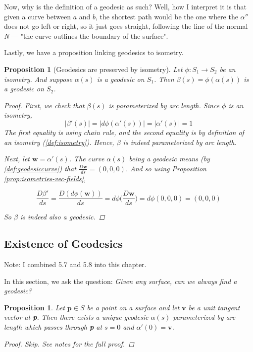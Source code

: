 \documentclass[10pt, a4paper]{article}
\theoremstyle{plain}
\newtheorem{proposition}[theorem]{Proposition}
\theoremstyle{definition}
\theoremstyle{remark}
\newenvironment{sidenote}{%
  \par\vspace{0.5em}%
  \noindent\color{defcolor}%
}{%
  \par\vspace{0.5em}%
  \color{black}%
}
\begin{document}
\begin{sidenote}
    Now, why is the definition of a geodesic as such? Well, how I interpret it is that given a curve between $a$ and $b$, the shortest path would be the one where the $\alpha''$ does not go left or right, so it just goes straight, following the line of the normal \textit{N} --- "the curve outlines the boundary of the surface".
\end{sidenote}

Lastly, we have a proposition linking geodesics to isometry.

\begin{proposition}[Geodesics are preserved by isometry]
Let $\phi :S_1 \to S_2$ be an isometry. And suppose $\alpha(s)$ is a geodesic on $S_1$. Then $\beta(s) =  \phi(\alpha(s))$ is a geodesic on $S_2$.

\begin{proof}
    First, we check that $\beta(s)$ is parameterized by arc length. Since $\phi$ is an isometry, 
    $$|\beta'(s)| = | d\phi(\alpha'(s))| =|\alpha'(s)| =1$$
    The first equality is using chain rule, and the second equality is by definition of an isometry (\ref{def:isometry}). Hence, $\beta$ is indeed parameterized by arc length.

    Next, let $\textbf{w} = \alpha'(s)$. The curve $\alpha(s)$ being a geodesic means (by \ref{def:geodesiccurve}) that $\frac{D\textbf{w}}{ds} = (0,0,0)$. And so using Proposition \ref{prop:isometries-vec-fields},

    $$\frac{D\beta'}{ds} =\frac{D (d\phi(\textbf{w}))}{ds} = d\phi \Bigg(\frac{D\textbf{w}}{ds} \Bigg) = d\phi(0,0,0) = (0,0,0)$$

So $\beta$ is indeed also a geodesic.
\end{proof}
\end{proposition}

\subsection{Existence of Geodesics}
\begin{sidenote}
    Note: I combined 5.7 and 5.8 into this chapter.
\end{sidenote}
In this section, we ask the question: \textit{Given any surface, can we always find a geodesic?}

\begin{proposition}\label{prop:existence-of-geodesic}
    Let $\textbf{p} \in S$ be a point on a surface and let $\textbf{v}$ be a unit tangent vector at \textbf{p}. Then there exists a unique geodesic $\alpha(s)$ parameterized by arc length
 which passes through \textbf{p} at $s=0$ and $\alpha'(0) = \textbf{v}$.

 \begin{proof}
     Skip. See notes for the full proof.
 \end{proof}
 \end{proposition}
\end{document}
